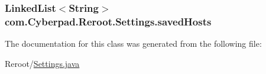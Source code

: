 \label{classcom_1_1_cyberpad_1_1_reroot_1_1_settings_a34430b1c71d7ccf7fec0edf1cc648fd4}
\hypertarget{classcom_1_1_cyberpad_1_1_reroot_1_1_settings_a39d6b93260518fa9a44568c5062c7214}{
\subsubsection[{saved\-Hosts}]{\setlength{\rightskip}{0pt plus 5cm}\-Linked\-List$<$\-String$>$ {\bf com.\-Cyberpad.\-Reroot.\-Settings.\-saved\-Hosts}}}
\label{classcom_1_1_cyberpad_1_1_reroot_1_1_settings_a39d6b93260518fa9a44568c5062c7214}


\-The documentation for this class was generated from the following file\-:\begin{DoxyCompactItemize}
\item 
\-Reroot/\hyperlink{_settings_8java}{\-Settings.\-java}\end{DoxyCompactItemize}
